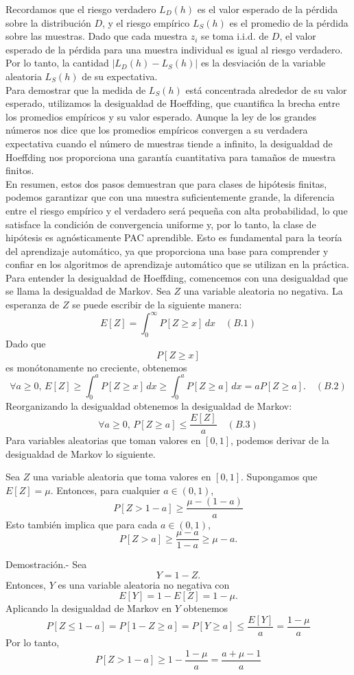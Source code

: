 Recordamos que el riesgo verdadero $ L_D(h) $ es el valor esperado de la pérdida sobre la distribución $ D $, y el riesgo empírico $ L_S(h) $ es el promedio de la pérdida sobre las muestras. Dado que cada muestra $ z_i $ se toma i.i.d. de $D$, el valor esperado de la pérdida para una muestra individual es igual al riesgo verdadero. Por lo tanto, la cantidad $|L_D(h) - L_S(h)|$ es la desviación de la variable aleatoria $L_S(h)$ de su expectativa.\\

Para demostrar que la medida de $ L_S(h) $ está concentrada alrededor de su valor esperado, utilizamos la desigualdad de Hoeffding, que cuantifica la brecha entre los promedios empíricos y su valor esperado. Aunque la ley de los grandes números nos dice que los promedios empíricos convergen a su verdadera expectativa cuando el número de muestras tiende a infinito, la desigualdad de Hoeffding nos proporciona una garantía cuantitativa para tamaños de muestra finitos.\\

En resumen, estos dos pasos demuestran que para clases de hipótesis finitas, podemos garantizar que con una muestra suficientemente grande, la diferencia entre el riesgo empírico y el verdadero será pequeña con alta probabilidad, lo que satisface la condición de convergencia uniforme y, por lo tanto, la clase de hipótesis es agnósticamente PAC aprendible. Esto es fundamental para la teoría del aprendizaje automático, ya que proporciona una base para comprender y confiar en los algoritmos de aprendizaje automático que se utilizan en la práctica.\\


Para entender la desigualdad de Hoeffding, comencemos con una desigualdad que se llama la desigualdad de Markov. Sea $Z$ una variable aleatoria no negativa. La esperanza de $Z$ se puede escribir de la siguiente manera:
$$
E[Z] = \int_{0}^{\infty} P[Z \geq x] \, dx \quad (B.1)
$$
Dado que $$ P[Z \geq x] $$ es monótonamente no creciente, obtenemos
$$
\forall a \geq 0, \, E[Z] \geq \int_{0}^{a} P[Z \geq x] \, dx \geq \int_{0}^{a} P[Z \geq a] \, dx = a P[Z \geq a]. \quad (B.2)
$$
Reorganizando la desigualdad obtenemos la desigualdad de Markov:
$$
\forall a \geq 0, \, P[Z \geq a] \leq \frac{E[Z]}{a} \quad (B.3)
$$
Para variables aleatorias que toman valores en $[0, 1]$, podemos derivar de la desigualdad de Markov lo siguiente.

\begin{teo}
Sea $Z$ una variable aleatoria que toma valores en $[0, 1]$. Supongamos que
$ E[Z] = \mu $. Entonces, para cualquier $ a \in (0, 1) $,
$$
P[Z > 1 - a] \geq \frac{\mu - (1 - a)}{a}
$$
Esto también implica que para cada $ a \in (0, 1) $,
$$
P[Z > a] \geq \frac{\mu - a}{1 - a} \geq \mu - a.
$$

Demostración.-\; Sea $$ Y = 1 - Z.$$ Entonces, $Y$ es una variable aleatoria no negativa con 
$$ E[Y] = 1 - E[Z] = 1 - \mu. $$ 
Aplicando la desigualdad de Markov en $ Y $ obtenemos
$$
P[Z \leq 1 - a] = P[1 - Z \geq a] = P[Y \geq a] \leq \frac{E[Y]}{a} = \frac{1 - \mu}{a}
$$
Por lo tanto,
$$
P[Z > 1 - a] \geq 1 - \frac{1 - \mu}{a} = \frac{a + \mu - 1}{a}
$$
\end{teo}

